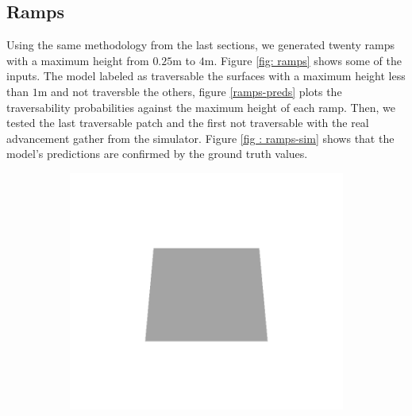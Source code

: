 \documentclass[../document.tex]{subfiles}
\begin{document}
\subsection{Ramps}
Using the same methodology from the last sections, we generated twenty ramps with a maximum height from $0.25$m to $4$m. Figure \ref{fig: ramps} shows some of the inputs. The model labeled as traversable the surfaces with a maximum height less than $1$m and not traversble the others, figure \ref{ramps-preds} plots the traversability probabilities against the maximum height of each ramp. Then, we tested the last traversable patch and the first not traversable with the real advancement gather from the simulator. Figure \ref{fig : ramps-sim} shows that the model's predictions are confirmed by the ground truth values. 

\begin{figure}[htbp]
    \centering
    \begin{subfigure}[b]{0.24\textwidth}
    \includegraphics[width=\linewidth]{../img/5/custom_patches/ramp/all/00-3d.png}
    \end{subfigure}
    \begin{subfigure}[b]{0.24\textwidth}

\end{subfigure}
\end{figure}
\end{document}
